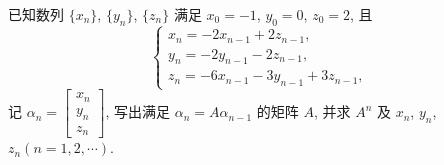 \begin{example}{}{}
    已知数列 $\{x_n\}$, $\{y_n\}$, $\{z_n\}$ 满足 $x_0 = -1$, $y_0 = 0$, $z_0 = 2$, 且
    $$\begin{cases}
            x_n = -2x_{n-1} + 2z_{n-1}, \\
            y_n = -2y_{n-1} - 2z_{n-1}, \\
            z_n = -6x_{n-1} - 3y_{n-1} + 3z_{n-1},
        \end{cases}$$
    记 $\alpha_n = \begin{bmatrix} x_n \\ y_n \\ z_n \end{bmatrix}$, 写出满足 $\alpha_n = A\alpha_{n-1}$ 的矩阵 $A$, 并求 $A^n$ 及 $x_n$, $y_n$, $z_n (n=1,2,\cdots)$.
\end{example}
